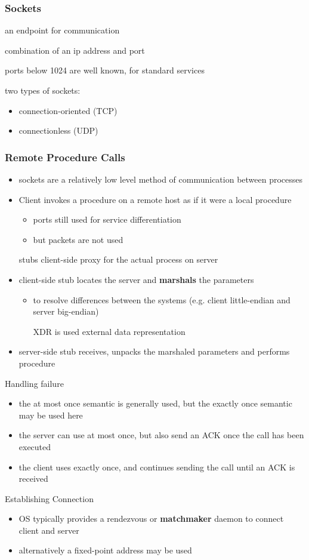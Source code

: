 \documentclass[11pt]{article}
\begin{document}
\subsubsection{Sockets}
\label{sec:org81fea25}
\begin{description}
\item[{socket}] an endpoint for communication
\item combination of an ip address and port
\item ports below 1024 are well known, for standard services
\item two types of sockets:
\begin{itemize}
\item connection-oriented (TCP)
\item connectionless (UDP)
\end{itemize}
\end{description}
\subsubsection{Remote Procedure Calls}
\label{sec:org142d674}
\begin{itemize}
\item sockets are a relatively low level method of communication between processes
\item Client invokes a procedure on a remote host as if it were a local procedure
\begin{itemize}
\item ports still used for service differentiation
\item but packets are not used
\end{itemize}
\item[{stubs}] client-side proxy for the actual process on server
\item client-side stub locates the server and \textbf{marshals} the parameters
\begin{itemize}
\item to resolve differences between the systems (e.g. client little-endian and server big-endian)
\item[{XDR is used}] external data representation
\end{itemize}
\item server-side stub receives, unpacks the marshaled parameters and performs procedure
\end{itemize}
Handling failure
\begin{itemize}
\item the at most once semantic is generally used, but the exactly once semantic may be used here
\item the server can use at most once, but also send an ACK once the call has been executed
\item the client uses exactly once, and continues sending the call until an ACK is received
\end{itemize}
Establishing Connection
\begin{itemize}
\item OS typically provides a rendezvous or \textbf{matchmaker} daemon to connect client and server
\item alternatively a fixed-point address may be used
\end{itemize}
\end{document}
